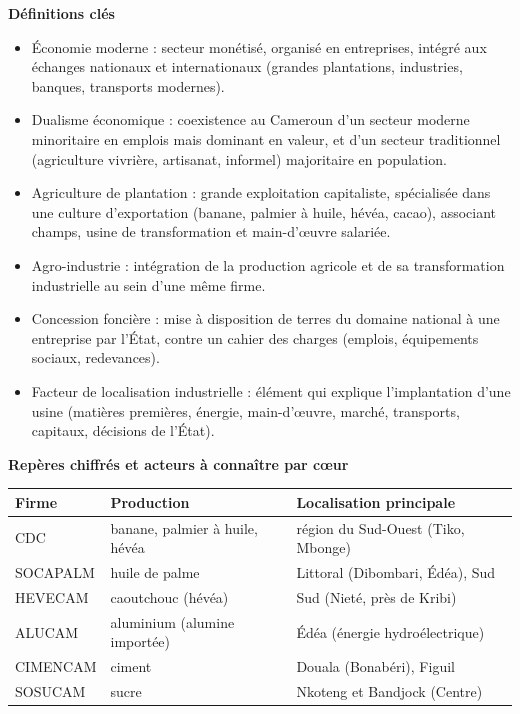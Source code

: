 \documentclass[11pt]{article}
\newcommand{\cle}[1]{{\popxbold\color{popdark}#1}}
\begin{document}
\begin{aretenir}
\textbf{Définitions clés}
\begin{itemize}
\item \cle{Économie moderne} : secteur monétisé, organisé en entreprises, intégré aux échanges nationaux et internationaux (grandes plantations, industries, banques, transports modernes).
\item \cle{Dualisme économique} : coexistence au Cameroun d'un secteur moderne minoritaire en emplois mais dominant en valeur, et d'un secteur traditionnel (agriculture vivrière, artisanat, informel) majoritaire en population.
\item \cle{Agriculture de plantation} : grande exploitation capitaliste, spécialisée dans une culture d'exportation (banane, palmier à huile, hévéa, cacao), associant champs, usine de transformation et main-d'œuvre salariée.
\item \cle{Agro-industrie} : intégration de la production agricole et de sa transformation industrielle au sein d'une même firme.
\item \cle{Concession foncière} : mise à disposition de terres du domaine national à une entreprise par l'État, contre un cahier des charges (emplois, équipements sociaux, redevances).
\item \cle{Facteur de localisation industrielle} : élément qui explique l'implantation d'une usine (matières premières, énergie, main-d'œuvre, marché, transports, capitaux, décisions de l'État).
\end{itemize}

\textbf{Repères chiffrés et acteurs à connaître par cœur}
\begin{center}
\begin{tabularx}{\linewidth}{|l|X|X|}\hline
\rowcolor{popblueL} \textbf{Firme} & \textbf{Production} & \textbf{Localisation principale} \\ \hline
CDC & banane, palmier à huile, hévéa & région du Sud-Ouest (Tiko, Mbonge) \\ \hline
SOCAPALM & huile de palme & Littoral (Dibombari, Édéa), Sud \\ \hline
HEVECAM & caoutchouc (hévéa) & Sud (Nieté, près de Kribi) \\ \hline
ALUCAM & aluminium (alumine importée) & Édéa (énergie hydroélectrique) \\ \hline
CIMENCAM & ciment & Douala (Bonabéri), Figuil \\ \hline
SOSUCAM & sucre & Nkoteng et Bandjock (Centre) \\ \hline
\end{tabularx}
\end{center}


\end{aretenir}
\end{document}
